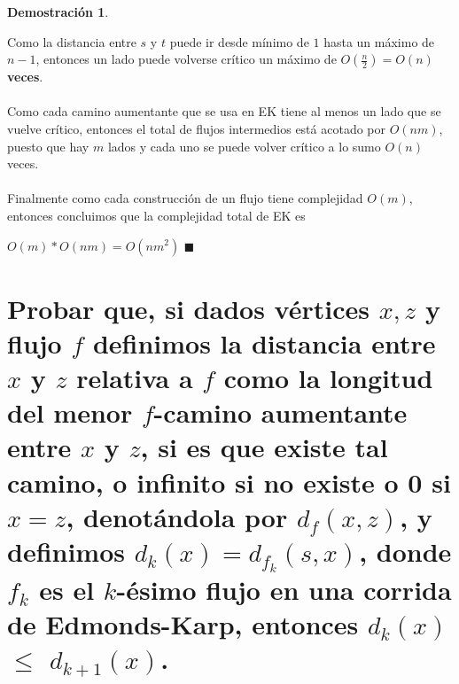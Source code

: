 \documentclass[11pt, a4paper]{article}
\theoremstyle{definition}
\newtheorem*{demostracion}{Demostración}
\begin{document}
\begin{demostracion}
\begin{itemize}
                Como la distancia entre $s$ y $t$ puede ir desde mínimo de $1$ hasta un máximo de $n-1$, entonces un lado puede volverse crítico 
                un máximo de \textbf{$O(\frac{n}{2}) = O(n)$ veces}.\\ \\
                Como cada camino aumentante que se usa en EK tiene al menos un lado que se vuelve crítico, entonces el total de flujos intermedios está
                acotado por $O(nm)$, puesto que hay $m$ lados y cada uno se puede volver crítico a lo sumo $O(n)$ veces.\\ \\
                Finalmente como cada construcción de un flujo tiene complejidad $O(m)$, entonces concluimos que la complejidad total de EK es 
                \begin{center}
                    $O(m)*O(nm) = O(nm^2)$ $\blacksquare$
                \end{center}     
    \end{itemize}
\end{demostracion}
\section{Probar que, si dados vértices $x,z$ y flujo $f$ definimos la distancia entre $x$ y $z$ relativa a $f$ como la longitud del menor
        $f$-camino aumentante entre $x$ y $z$, si es que existe tal camino, o infinito si no existe o 0 si $x=z$, denotándola por $d_f(x,z)$,
        y definimos $d_k(x)=d_{f_k}(s,x)$, donde $f_k$ es el $k$-ésimo flujo en una corrida de Edmonds-Karp, entonces $d_k(x)$ $\leq$ $d_{k+1}(x)$.}
\end{document}
